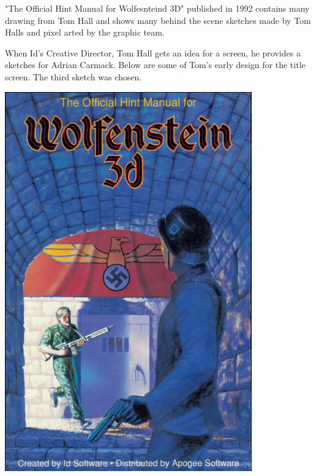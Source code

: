 \documentclass[book.tex]{subfiles}
\begin{document}
\begin{minipage}{0.7\textwidth}
 "The Official Hint Manual for Wolfesnteind 3D" published in 1992 contains many drawing from Tom Hall and shows many behind the scene sketches made by Tom Halls and pixel arted by the graphic team.\\
\par
 \begin{fancyquotes}
When Id's Creative Director, Tom Hall gets an idea for a screen, he provides a sketches for Adrian Carmack. Below are some of Tom's early design for the title screen. The third sketch was chosen.\\
\end{fancyquotes}
\end{minipage}
\begin{minipage}{0.3\textwidth}
\begin{flushright}
\includegraphics[width=0.8\textwidth]{imgs/hint_manual_cover.png}
\end{flushright}
\end{minipage}
\end{document}
